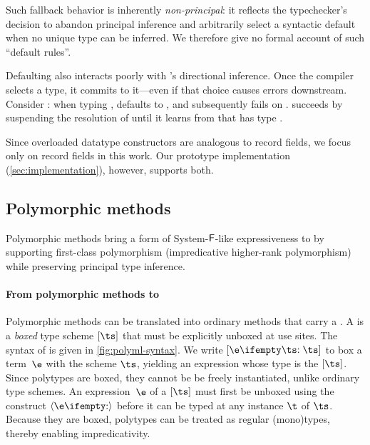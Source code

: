 \documentclass[acmsmall,screen,nonacm%
\Anonymous{,anonymous}{}%
\Final{}{,review}%
]{acmart}
\newcommand{\BBpolyml}{Garrigue-Remy/poly-ml}
\begin{document}

Such fallback behavior is inherently \emph{non-principal}: it reflects the
typechecker's decision to abandon principal inference and arbitrarily select a
syntactic default when no unique type can be inferred. We therefore give no
formal account of such ``default rules''.


Defaulting also interacts poorly with \OCaml's directional inference. Once the
compiler selects a type, it commits to it---even if that choice causes errors
downstream. Consider : when typing , \OCaml defaults
 to , and subsequently fails on .
\OML succeeds by suspending the resolution of  until it learns from
 that  has type .


Since overloaded datatype constructors are analogous to record fields, we focus
only on record fields in this work. Our prototype implementation
(\cref{sec:implementation}), however, supports both.

\subsection{Polymorphic methods}


Polymorphic methods \citep*{\BBpolyml} bring a form of
System-$\mathopen{}\mathrel{\mathsf{F}}$-like expressiveness to \OCaml by supporting first-class
polymorphism (impredicative higher-rank polymorphism) while preserving
principal type inference.

\paragraph{From polymorphic methods to \polytypes}
\label{sec/overview/polymethods-reduction}


Polymorphic methods can be translated into ordinary methods that carry a
\emph{\polytype}.
A \polytype is
a \emph{boxed} type scheme $\tpoly \ts$ that
must be explicitly unboxed at use sites. The syntax of \polytypes is given in
\cref{fig:polyml-syntax}.
%
We write $\epoly[\ts] \e$ to box a term~$\e$ with the scheme $\ts$, yielding
an expression whose type is the \polytype $\tpoly \ts$. Since polytypes are
boxed, they cannot be be freely instantiated, unlike ordinary type schemes. An
expression~$\e$ of a \polytype $\tpoly \ts$ must first be unboxed using the
construct $\einst \e$ before it can be typed at any instance $\t$ of $\ts$. 
Because they are boxed, polytypes can be treated as regular
(mono)types, thereby enabling impredicativity.
\end{document}
